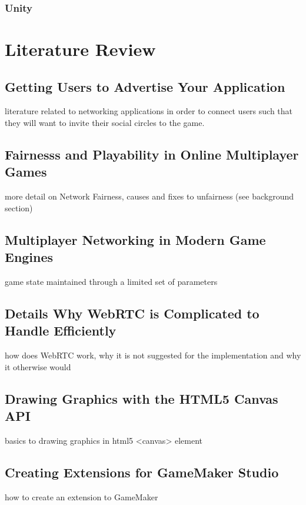 \documentclass[bsc,frontabs,twoside,singlespacing,parskip,deptreport]{infthesis}     %
\begin{document}
\subsection{Unity}






\chapter{Literature Review}

\section{Getting Users to Advertise Your Application}
literature related to networking applications in order to connect users such that they will want to invite their social circles to the game.

\section{Fairnesss and Playability in Online Multiplayer Games}
more detail on Network Fairness, causes and fixes to unfairness (see background section)

\section{Multiplayer Networking in Modern Game Engines}
game state maintained through a limited set of parameters

\section{Details Why WebRTC is Complicated to Handle Efficiently}
how does WebRTC work, why it is not suggested for the implementation and why it otherwise would

\section{Drawing Graphics with the HTML5 Canvas API}
basics to drawing graphics in html5 <canvas> element

\section{Creating Extensions for GameMaker Studio}
how to create an extension to GameMaker
\end{document}
